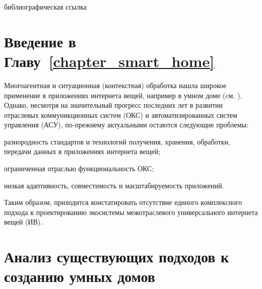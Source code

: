 \begin{SCn}
	\bigskip
	
	\begin{scnrelfromlist}{библиографическая ссылка}
	\end{scnrelfromlist}	
\end{SCn}

\section*{Введение в Главу~\ref{chapter_smart_home}}

Многоагентная и ситуационная (контекстная) обработка нашла широкое применение в приложениях интернета вещей, например в умном доме (cм. ). Однако, несмотря на значительный прогресс последних лет в развитии отраслевых коммуникционных систем (ОКС) и автоматизированных систем управления (АСУ), по-прежнему актуальными остаются следующие проблемы:
\begin{textitemize}
	\item разнородность стандартов и технологий получения, хранения, обработки, передачи данных в приложениях интернета вещей;
	\item ограниченная отраслью функциональность ОКС;
	\item низкая адаптивность, совместимость и масштабируемость приложений.
\end{textitemize}

Таким образом, приходится констатировать отсутствие единого комплексного подхода к проектированию экосистемы межотраслевого универсального интернета вещей (ИВ).

\section{Анализ существующих подходов к созданию умных домов}
\label{sec_approach_analysis_for_smart_homes_design}

